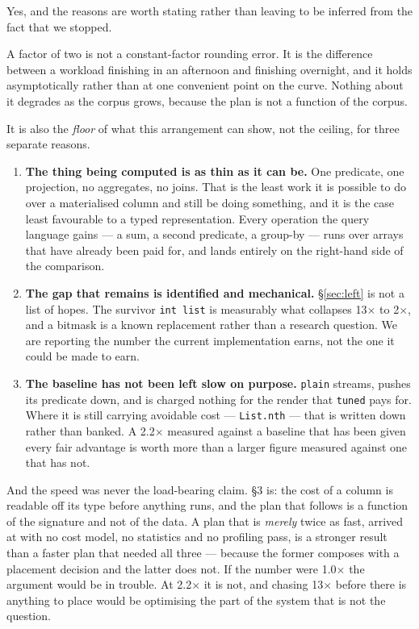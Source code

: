 \documentclass[11pt,a4paper]{article}
\begin{document}
Yes, and the reasons are worth stating rather than leaving to be inferred from the fact
that we stopped.

A factor of two is not a constant-factor rounding error. It is the difference between a
workload finishing in an afternoon and finishing overnight, and it holds asymptotically
rather than at one convenient point on the curve. Nothing about it degrades as the
corpus grows, because the plan is not a function of the corpus.

It is also the \emph{floor} of what this arrangement can show, not the ceiling, for
three separate reasons.

\begin{enumerate}[leftmargin=1.4em]
\item \textbf{The thing being computed is as thin as it can be.} One predicate, one
  projection, no aggregates, no joins. That is the least work it is possible to do over
  a materialised column and still be doing something, and it is the case least
  favourable to a typed representation. Every operation the query language gains --- a
  sum, a second predicate, a group-by --- runs over arrays that have already been paid
  for, and lands entirely on the right-hand side of the comparison.
\item \textbf{The gap that remains is identified and mechanical.} \S\ref{sec:left}
  is not a list of hopes. The survivor \texttt{int list} is measurably what collapses
  13$\times$ to 2$\times$, and a bitmask is a known replacement rather than a research
  question. We are reporting the number the current implementation earns, not the one
  it could be made to earn.
\item \textbf{The baseline has not been left slow on purpose.} \texttt{plain} streams,
  pushes its predicate down, and is charged nothing for the render that \texttt{tuned}
  pays for. Where it is still carrying avoidable cost --- \texttt{List.nth} --- that is
  written down rather than banked. A 2.2$\times$ measured against a baseline that has
  been given every fair advantage is worth more than a larger figure measured against
  one that has not.
\end{enumerate}

\noindent
And the speed was never the load-bearing claim. \S3 is: the cost of a column is
readable off its type before anything runs, and the plan that follows is a function of
the signature and not of the data. A plan that is \emph{merely} twice as fast, arrived
at with no cost model, no statistics and no profiling pass, is a stronger result than a
faster plan that needed all three --- because the former composes with a placement
decision and the latter does not. If the number were 1.0$\times$ the argument would be
in trouble. At 2.2$\times$ it is not, and chasing 13$\times$ before there is anything
to place would be optimising the part of the system that is not the question.
\end{document}
